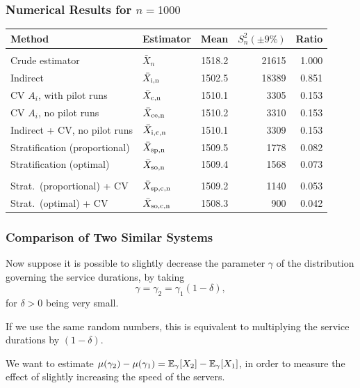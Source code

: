 \documentclass[t,usepdftitle=false,aspectratio=169]{beamer}
\begin{document}
\begin{frame}
	\frametitle{Numerical Results for \(n = 1000\)}
	
	\begin{small}
		\begin{tabular}{llrrr}
			\hline
			Method                & Estimator
			& Mean   & $S_n^2 (\pm 9\%)$ & Ratio \\
			\hline
			&&&&\\
			Crude estimator             & $\bar X_n$
			& 1518.2 & 21615  &  1.000 \\
			Indirect                    & $\bar X_{\rm{i},n}$
			& 1502.5 & 18389  &  0.851 \\
			CV $A_i$, with pilot runs   & $\bar X_{\rm{c},n}$
			& 1510.1 &  3305  &  0.153 \\
			CV $A_i$, no pilot runs     & $\bar X_{\rm{c}e,n}$
			& 1510.2 &  3310  &  0.153 \\
			Indirect + CV, no pilot runs & $\bar X_{\rm{i},\rm{c},n}$
			& 1510.1 &  3309  &  0.153 \\
			Stratification (proportional)   & $\bar X_{\rm{s}p,n}$
			& 1509.5 &  1778  &  0.082 \\
			Stratification (optimal)    & $\bar X_{\rm{s}o,n}$
			& 1509.4 &  1568  &  0.073 \\
			&&&& \\
			Strat.\ (proportional) + CV & $\bar X_{\rm{s}p,\rm{c},n}$
			& 1509.2 &  1140  &  0.053 \\
			Strat.\ (optimal) + CV & $\bar X_{\rm{s}o,\rm{c},n}$
			& 1508.3 &   900  &  0.042 \\
			\hline
		\end{tabular}
	\end{small}
	
\end{frame}

\begin{frame}
	\frametitle{Comparison of Two Similar Systems}
	
	Now suppose it is possible to slightly decrease the parameter \(\gamma\) of the distribution governing the service durations, by taking
	\[
	\gamma = {\gamma_2} = \gamma_1(1-\delta),
	\]
	for \({\delta} > 0\) being very small.
	
	\mbox{}
	
	If we use the same random numbers, this is equivalent to multiplying the service durations by \((1-\delta)\).
	
	\mbox{}
	
	We want to estimate \(\mu(\gamma_2) - \mu(\gamma_1) = {\mathbb{E}}_\gamma[X_2] - {\mathbb{E}}_\gamma[X_1]\),
	in order to measure the effect of slightly increasing the speed of the servers.
	
\end{frame}
\end{document}
